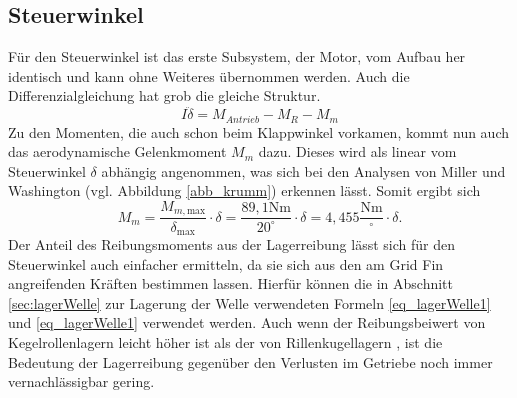 \subsection{Steuerwinkel}
Für den Steuerwinkel ist das erste Subsystem, der Motor, vom Aufbau her identisch und kann ohne Weiteres übernommen werden. Auch die Differenzialgleichung hat grob die gleiche Struktur.
\begin{equation}
	I\ddot{\delta} = M_{Antrieb} - M_{R} - M_{m}
\end{equation}
Zu den Momenten, die auch schon beim Klappwinkel vorkamen, kommt nun auch das aerodynamische Gelenkmoment $M_m$ dazu. Dieses wird als linear vom Steuerwinkel $\delta$ abhängig angenommen, was sich bei den Analysen von Miller und Washington \cite{synopsis} (vgl. Abbildung \ref{abb_krumm}) erkennen lässt. Somit ergibt sich
\begin{equation}
	M_{m} = \frac{M_{m, \mathrm{max}}}{\delta_\mathrm{max}} \cdot \delta =\frac{89,1\mathrm{Nm}}{20^\circ} \cdot \delta = 4,455\frac{\mathrm{Nm}}{^\circ}\cdot \delta.
\end{equation}
Der Anteil des Reibungsmoments aus der Lagerreibung lässt sich für den Steuerwinkel auch einfacher ermitteln, da sie sich aus den am Grid Fin angreifenden Kräften bestimmen lassen. Hierfür können die in Abschnitt \ref{sec:lagerWelle} zur Lagerung der Welle verwendeten Formeln \ref{eq_lagerWelle1} und \ref{eq_lagerWelle1} verwendet werden. Auch wenn der Reibungsbeiwert von Kegelrollenlagern leicht höher ist als der von Rillenkugellagern \cite{lagerreibung}, ist die Bedeutung der Lagerreibung gegenüber den Verlusten im Getriebe noch immer vernachlässigbar gering.


